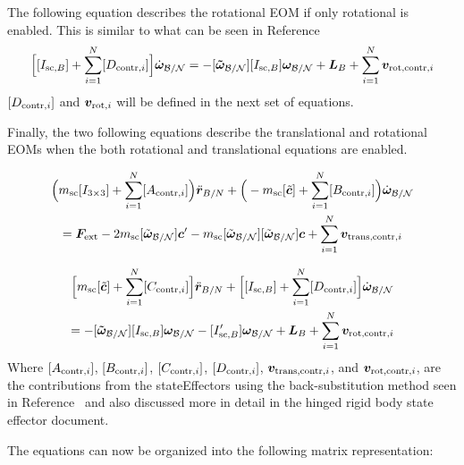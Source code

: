 The following equation describes the rotational EOM if only rotational is enabled. This is similar to what can be seen in Reference~\cite{schaub} 
\begin{equation}
\Big[[I_{\text{sc},B}]+\sum\limits_{i=1}^{N} [D_{\textnormal{contr},i}]\Big] \dot{\bm\omega}_{\cal B/N} = - [\bm{\tilde{\omega}}_{\cal B/N}] [I_{\text{sc},B}] \bm\omega_{\cal B/N} + \bm{L}_B +\sum\limits_{i=1}^{N} \bm v_{\textnormal{rot,contr},i}
	\label{eq:Final6}
\end{equation}
$[D_{\textnormal{contr},i}]$ and $\bm v_{\textnormal{rot},i}$ will be defined in the next set of equations. 

Finally, the two following equations describe the translational and rotational EOMs when the both rotational and translational equations are enabled. 

\begin{multline}
\Big(m_{\text{sc}} [I_{3\times3}] +\sum_{i=1}^{N}[A_{\textnormal{contr},i}]\Big)\ddot{\bm r}_{B/N}+\Big(-m_{\text{sc}} [\tilde{\bm{c}}] +\sum_{i=1}^{N}[B_{\textnormal{contr},i}]\Big) \dot{\bm\omega}_{\cal B/N} \\
= \bm F_{\textnormal{ext}} 	- 2 m_{\text{sc}} [\tilde{\bm\omega}_{\cal B/N}] \bm c'
-m_{\text{sc}} [\tilde{\bm\omega}_{\cal B/N}][\tilde{\bm\omega}_{\cal B/N}]\bm{c}
+\sum_{i=1}^{N}\bm v_{\textnormal{trans,contr},i}
\label{eq:Rbddot8}
\end{multline}

\begin{multline}
\Big[m_{\text{sc}}[\tilde{\bm{c}}] +\sum\limits_{i=1}^{N}[C_{\textnormal{contr},i}]\Big]\ddot{\bm r}_{B/N}+\Big[[I_{\text{sc},B}]+\sum\limits_{i=1}^{N}[D_{\textnormal{contr},i}]\Big]\dot{\bm\omega}_{\cal B/N}
\\
= -[\bm{\tilde{\omega}}_{\cal B/N}] [I_{\text{sc},B}] \bm\omega_{\cal B/N} 
- [I'_{\text{sc},B}] \bm\omega_{\cal B/N} + \bm{L}_B +\sum\limits_{i=1}^{N}\bm v_{\textnormal{rot,contr},i}
\label{eq:Final9}
\end{multline}	
Where $[A_{\textnormal{contr},i}]$, $[B_{\textnormal{contr},i}]$, $[C_{\textnormal{contr},i}]$, $[D_{\textnormal{contr},i}]$, $\bm v_{\textnormal{trans,contr},i}$, and $\bm v_{\textnormal{rot,contr},i}$, are the contributions from the stateEffectors using the back-substitution method seen in Reference~\cite{Allard2016rz} and also discussed more in detail in the hinged rigid body state effector document.

The equations can now be organized into the following matrix representation:

